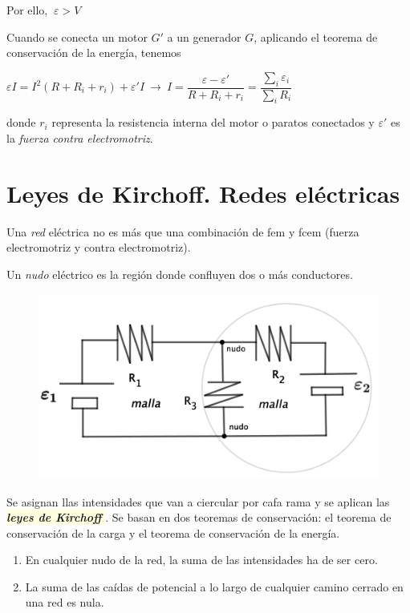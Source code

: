 Por ello, $ \ \varepsilon > V$

Cuando se conecta un motor $G'$ a un generador $G$, aplicando el teorema de conservación de la energía, tenemos

$\varepsilon I=I^2(R+R_i+r_i)+\varepsilon' I \ \to \ I=\dfrac{\varepsilon -\varepsilon'}{R+R_i+r_i}= \dfrac{\sum_i \varepsilon_i}{\sum_i R_i}$

donde $r_i$ representa la resistencia interna del motor o paratos conectados y $\varepsilon'$ es la \emph{fuerza contra electromotriz}.

\section{Leyes de Kirchoff. Redes eléctricas}

\begin{multicols}{2}
Una \emph{red} eléctrica no es más que una combinación de fem y fcem (fuerza electromotriz y contra electromotriz).

Un \emph{nudo} eléctrico es la región donde confluyen dos o más conductores.
	\begin{figure}[H]
	\centering
	\includegraphics[width=.5\textwidth]{imagenes/imagenes25/T25IM07.png}
\end{figure}
\end{multicols}
Se asignan llas intensidades que van a ciercular por cafa rama y se aplican las \colorbox{LightYellow}{ \emph{\textbf{leyes de Kirchoff}} }. Se basan en dos teoremas de conservación: el teorema de conservación de la carga y el teorema de conservación de la energía.

\begin{miparrafodestacado}
\begin{enumerate}
	\item En cualquier nudo de la red, la suma de las intensidades ha de ser cero.
	\item La suma de las caídas de potencial a lo largo de cualquier camino cerrado en una red es nula.
\end{enumerate}
\end{miparrafodestacado}

